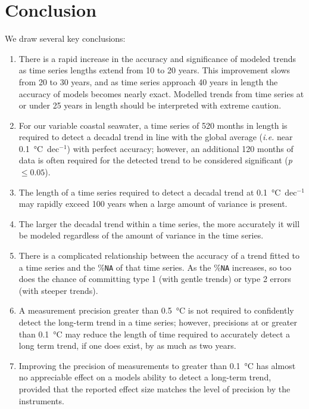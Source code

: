\documentclass[]{ametsoc}
\begin{document}
\section{Conclusion}
We draw several key conclusions:

\begin{enumerate}
\item There is a rapid increase in the accuracy and significance of modeled trends as time series lengths extend from 10 to 20 years. This improvement slows from 20 to 30 years, and as time series approach 40 years in length the accuracy of models becomes nearly exact. Modelled trends from time series at or under 25 years in length should be interpreted with extreme caution.

\item For our variable coastal seawater, a time series of 520 months in length is required to detect a decadal trend in line with the global average (\emph{i.e.} near \SI{0.1}{\degreeCelsius}~dec$^{-1}$) with perfect accuracy; however, an additional 120 months of data is often required for the detected trend to be considered significant (\emph{p} $\leq 0.05$).

\item The length of a time series required to detect a decadal trend at \SI{0.1}{\degreeCelsius}~dec$^{-1}$ may rapidly exceed 100 years when a large amount of variance is present.

\item The larger the decadal trend within a time series, the more accurately it will be modeled regardless of the amount of variance in the time series.

\item There is a complicated relationship between the accuracy of a trend fitted to a time series and the \%\texttt{NA} of that time series. As the \%\texttt{NA} increases, so too does the chance of committing type 1 (with gentle trends) or type 2 errors (with steeper trends).

\item A measurement precision greater than \SI{0.5}{\degreeCelsius} is not required to confidently detect the long-term trend in a time series; however, precisions at or greater than \SI{0.1}{\degreeCelsius} may reduce the length of time required to accurately detect a long term trend, if one does exist, by as much as two years.

\item Improving the precision of measurements to greater than \SI{0.1}{\degreeCelsius} has almost no appreciable effect on a models ability to detect a long-term trend, provided that the reported effect size matches the level of precision by the instruments.
\end{enumerate}
\end{document}

